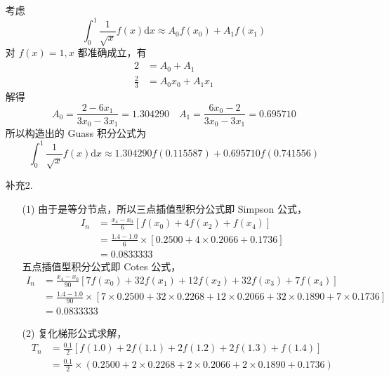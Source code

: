 \documentclass{sjtuarticle}
\def\dd{\mathrm{d}}
\begin{document}
\begin{itemize}
\begin{solution}
        考虑
        \begin{equation*}
            \int_{0}^1 \frac{1}{\sqrt{x}}f(x)\dd x\approx A_0f(x_0)+A_1f(x_1)
        \end{equation*}
        对 $f(x)=1,x$ 都准确成立，有
        \begin{align*}
            2 &= A_0 + A_1 \\
            \frac{2}{3} &= A_0x_0+A_1x_1
        \end{align*}
        解得
        \begin{equation*}
            A_0=\frac{2-6x_1}{3x_0-3x_1}=1.304290 \quad A_1=\frac{6x_0-2}{3x_0-3x_1}=0.695710
        \end{equation*}
        所以构造出的 Guass 积分公式为
        \begin{equation*}
            \int_{0}^1 \frac{1}{\sqrt{x}}f(x)\dd x\approx 1.304290f(0.115587)+0.695710f(0.741556)
        \end{equation*}
    \end{solution}
    \item[补充2.] \begin{solution}
        \begin{itemize}
            \item[(1)] 由于是等分节点，所以三点插值型积分公式即 Simpson 公式，
            \begin{align*}
                I_n &= \frac{x_4-x_0}{6}[f(x_0)+4f(x_2)+f(x_4)] \\
                    &= \frac{1.4-1.0}{6}\times[0.2500+4\times 0.2066+0.1736]\\
                    &= 0.0833333
            \end{align*}
            五点插值型积分公式即 Cotes 公式，
            \begin{align*}
                I_n &=\frac{x_4-x_0}{90}[7f(x_0)+32f(x_1)+12f(x_2)+32f(x_3)+7f(x_4)]\\
                &=\frac{1.4-1.0}{90}\times [7\times 0.2500+32\times 0.2268+12\times 0.2066+32\times 0.1890+7\times 0.1736]\\
                &=0.0833333
            \end{align*}
            \item[(2)] 复化梯形公式求解，
            \begin{align*}
                T_n&=\frac{0.1}{2}[f(1.0)+2f(1.1)+2f(1.2)+2f(1.3)+f(1.4)]\\
                &=\frac{0.1}{2}\times (0.2500+2\times 0.2268+2\times 0.2066+2\times 0.1890+0.1736)\\

\end{align*}
\end{itemize}
\end{solution}
\end{itemize}
\end{document}

